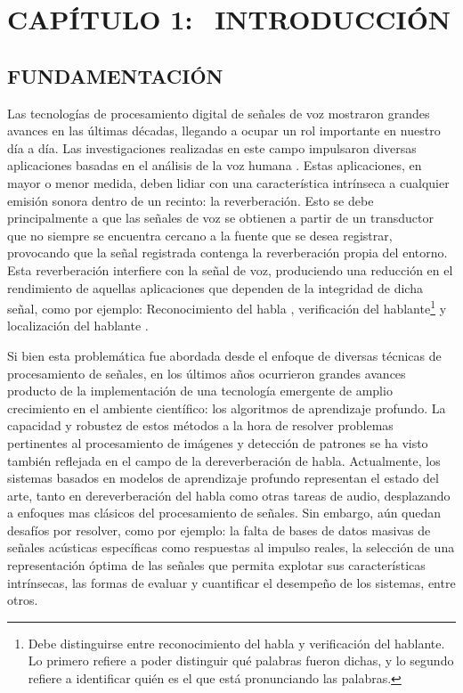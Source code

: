 \section[Introducción]{CAPÍTULO 1:$\ \ \ \ $INTRODUCCIÓN} 

\subsection[Fundamentación]{FUNDAMENTACIÓN}
Las tecnologías de procesamiento digital de señales de voz mostraron grandes avances en las últimas décadas, llegando a ocupar un rol importante en nuestro día a día. Las investigaciones realizadas en este campo impulsaron diversas aplicaciones basadas en el análisis de la voz humana \cite{fun1}\cite{fun2}. 
Estas aplicaciones, en mayor o menor medida, deben lidiar con una característica intrínseca a cualquier emisión sonora dentro de un recinto: la reverberación. Esto se debe principalmente a que las señales de voz se obtienen a partir de un transductor que no siempre se encuentra cercano a la fuente que se desea registrar, provocando que la señal registrada contenga la reverberación propia del entorno. Esta reverberación interfiere con la señal de voz, produciendo una reducción en el rendimiento de aquellas aplicaciones que dependen de la integridad de dicha señal, como por ejemplo: Reconocimiento del habla \cite{reconocimiento}, verificación del hablante\footnote{Debe distinguirse entre reconocimiento del habla y verificación del hablante. Lo primero refiere a poder distinguir qué palabras fueron dichas, y lo segundo refiere a identificar quién es el que está pronunciando las palabras.} \cite{verificacion} y localización del hablante \cite{localizacion}.

Si bien esta problemática fue abordada desde el enfoque de diversas técnicas de procesamiento de señales, en los últimos años ocurrieron grandes avances producto de la implementación de una tecnología emergente de amplio crecimiento en el ambiente científico: los algoritmos de aprendizaje profundo. La capacidad y robustez de estos métodos a la hora de resolver problemas pertinentes al procesamiento de imágenes y detección de patrones se ha visto también reflejada en el campo de la dereverberación de habla. Actualmente, los sistemas basados en modelos de aprendizaje profundo representan el estado del arte, tanto en dereverberación del habla como otras tareas de audio, desplazando a enfoques mas clásicos del procesamiento de señales. Sin embargo, aún quedan desafíos por resolver, como por ejemplo: la falta de bases de datos masivas de señales acústicas específicas como respuestas al impulso reales, la selección de una representación óptima de las señales que permita explotar sus características intrínsecas, las formas de evaluar y cuantificar el desempeño de los sistemas, entre otros.

